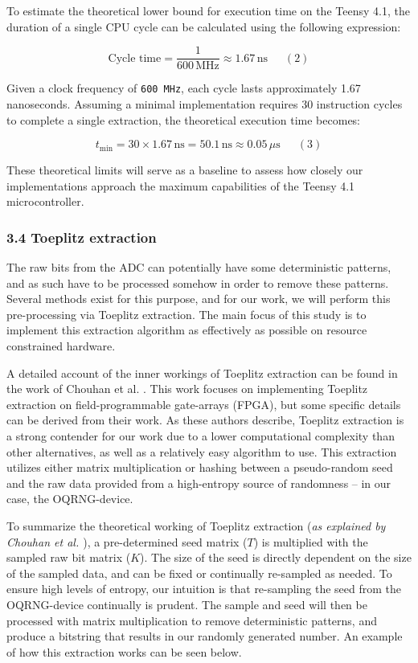 To estimate the theoretical lower bound for execution time on the Teensy 4.1, the duration of a single CPU cycle can be calculated using the following expression:

\[
\text{Cycle time} = \frac{1}{600\, \mathrm{MHz}} \approx 1.67\, \mathrm{ns} \phantom{123}(2)
\]

Given a clock frequency of \texttt{600\ MHz}, each cycle lasts approximately 1.67 nanoseconds. Assuming a minimal implementation requires 30 instruction cycles to complete a single extraction, the theoretical execution time becomes:

\[
t_{\text{min}} = 30 \times 1.67\,\mathrm{ns} = 50.1\,\mathrm{ns} \approx 0.05\,\mu\mathrm{s} \phantom{123}(3)
\]

These theoretical limits will serve as a baseline to assess how closely our implementations approach the maximum capabilities of the Teensy 4.1 microcontroller.

\subsubsection{3.4 Toeplitz extraction}\label{toeplitz-extraction}

The raw bits from the ADC can potentially have some deterministic patterns, and as such have to be processed somehow in order to remove these patterns. Several methods exist for this purpose, and for our work, we will perform this pre-processing via Toeplitz extraction. The main focus of this study is to implement this extraction algorithm as effectively as possible on resource constrained hardware.

A detailed account of the inner workings of Toeplitz extraction can be found in the work of Chouhan et al. \cite{toeplitz-desc}. This work focuses on implementing Toeplitz extraction on field-programmable gate-arrays (FPGA), but some specific details can be derived from their work. As these authors describe, Toeplitz extraction is a strong contender for our work due to a lower computational complexity than other alternatives, as well as a relatively easy algorithm to use. This extraction utilizes either matrix multiplication or hashing between a pseudo-random seed and the raw data provided from a high-entropy source of randomness -- in our case, the OQRNG-device.

To summarize the theoretical working of Toeplitz extraction (\emph{as explained by Chouhan et al. \cite{toeplitz-desc}}), a pre-determined seed matrix (\(T\)) is multiplied with the sampled raw bit matrix (\(K\)). The size of the seed is directly dependent on the size of the sampled data, and can be fixed or continually re-sampled as needed. To ensure high levels of entropy, our intuition is that re-sampling the seed from the OQRNG-device continually is prudent. The sample and seed will then be processed with matrix multiplication to remove deterministic patterns, and produce a bitstring that results in our randomly generated number. An example of how this extraction works can be seen below.

